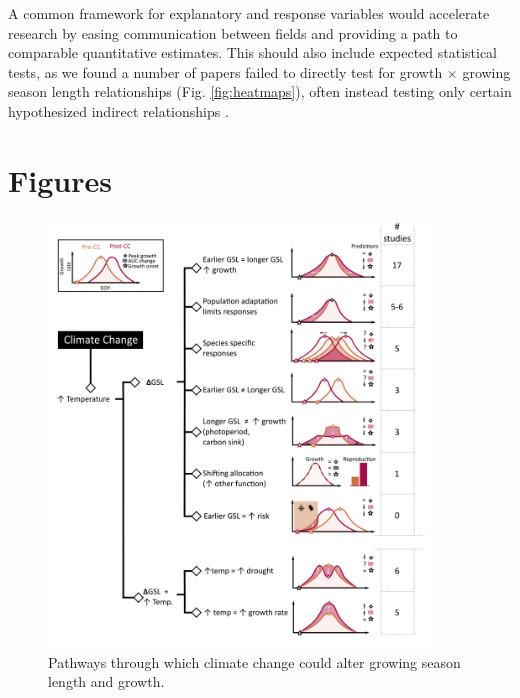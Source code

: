 \documentclass[11pt]{article}
\begin{document}
A common framework for explanatory and response variables would accelerate research by easing communication between fields and providing a path to comparable quantitative estimates. This should also include expected statistical tests, as we found a number of papers failed to directly test for growth $\times$ growing season length relationships (Fig. \ref{fig:heatmaps}), often instead testing only certain hypothesized indirect relationships \citep[e.g. spring temperature $\times$ growth in][]{dow2022warm}. %

\newpage
\section{Figures}

\clearpage
\begin{figure}[h!]
\includegraphics[width=0.9\textwidth]{..//figures/hypothesesconceptfig.png}
\caption{Pathways through which climate change could alter growing season length and growth.} %

\label{fig:hypotheses}
\end{figure}
\end{document}
